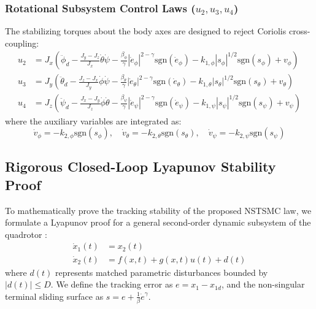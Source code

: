\subsubsection{Rotational Subsystem Control Laws ($u_2, u_3, u_4$)}
The stabilizing torques about the body axes are designed to reject Coriolis cross-coupling:
\begin{align}
u_2 &= J_x \left( \ddot{\phi}_d - \frac{J_y - J_z}{J_x}\dot{\theta}\dot{\psi} - \frac{\beta_{\phi}}{\gamma} |\dot{e}_{\phi}|^{2 - \gamma} \text{sgn}(\dot{e}_{\phi}) - k_{1,\phi}|s_{\phi}|^{1/2}\text{sgn}(s_{\phi}) + v_{\phi} \right) \\
u_3 &= J_y \left( \ddot{\theta}_d - \frac{J_z - J_x}{J_y}\dot{\phi}\dot{\psi} - \frac{\beta_{\theta}}{\gamma} |\dot{e}_{\theta}|^{2 - \gamma} \text{sgn}(\dot{e}_{\theta}) - k_{1,\theta}|s_{\theta}|^{1/2}\text{sgn}(s_{\theta}) + v_{\theta} \right) \\
u_4 &= J_z \left( \ddot{\psi}_d - \frac{J_x - J_y}{J_z}\dot{\phi}\dot{\theta} - \frac{\beta_{\psi}}{\gamma} |\dot{e}_{\psi}|^{2 - \gamma} \text{sgn}(\dot{e}_{\psi}) - k_{1,\psi}|s_{\psi}|^{1/2}\text{sgn}(s_{\psi}) + v_{\psi} \right)
\end{align}
where the auxiliary variables are integrated as:
\begin{equation}
\dot{v}_{\phi} = -k_{2,\phi} \text{sgn}(s_{\phi}), \quad \dot{v}_{\theta} = -k_{2,\theta} \text{sgn}(s_{\theta}), \quad \dot{v}_{\psi} = -k_{2,\psi} \text{sgn}(s_{\psi})
\end{equation}

\subsection{Rigorous Closed-Loop Lyapunov Stability Proof}
To mathematically prove the tracking stability of the proposed NSTSMC law, we formulate a Lyapunov proof for a general second-order dynamic subsystem of the quadrotor \cite{ref_81}:
\begin{align}
\dot{x}_1(t) &= x_2(t) \\
\dot{x}_2(t) &= f(x,t) + g(x,t)u(t) + d(t)
\end{align}
where $d(t)$ represents matched parametric disturbances bounded by $|d(t)| \leq D$. We define the tracking error as $e = x_1 - x_{1d}$, and the non-singular terminal sliding surface as $s = e + \frac{1}{\beta} \dot{e}^{\gamma}$. 

